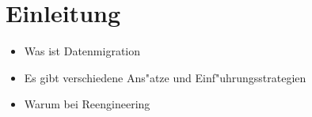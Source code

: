 \documentclass[11pt]{scrartcl}
\newif\iffull
\begin{document}
	
\iffull
\title{Data Migration} 

\subtitle{Untertitel}


\date{Modul Software Reengineering 2015/2016\\
  \small Fachbereich Informatik\\ 
  Arbeitsbereich Softwarekonstruktion \& Werkzeuge\\ 
  Universit"at Hamburg\\[4mm]
  \today}

\maketitle

\begin{abstract}
	\small\noindent\textbf{Abstract}

	\noindent Abstract 
\end{abstract}

\newpage
\tableofcontents
\newpage

\fi



\nocite{morris-2012}
\nocite{henrard-2002}
\nocite{behm-1997}
\nocite{datamigrations}
\nocite{ackermann-2005}
\nocite{wagner-2011}
\nocite{wu-1997}
\nocite{rahm-2010}
\nocite{alhajj-2001}

\section{Einleitung}

\begin{itemize}
	\item Was ist Datenmigration
	\item Es gibt verschiedene Ans"atze und Einf"uhrungsstrategien
	\item Warum bei Reengineering
\end{itemize}
\end{document}
